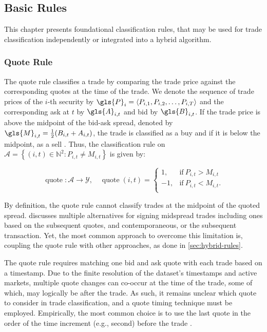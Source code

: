 \subsection{Basic Rules}\label{sec:basic-rules}

This chapter presents foundational classification rules, that may be used for trade classification independently or integrated into a hybrid algorithm.

\subsubsection{Quote Rule}\label{sec:quote-rule}

The quote rule classifies a trade by comparing the trade price against the corresponding quotes at the time of the trade. We denote the sequence of trade prices of the $i$-th security by $\gls{P}_i = \langle P_{i,1},P_{i,2},\dots,P_{i,T}\rangle$ and the corresponding ask at $t$ by $\gls{A}_{i,t}$ and bid by $\gls{B}_{i,t}$. If the trade price is above the midpoint of the bid-ask spread, denoted by $\gls{M}_{i,t} = \tfrac{1}{2}(B_{i,t} + A_{i,t})$, the trade is classified as a buy and if it is below the midpoint, as a sell \autocite[][41]{harrisDayEndTransactionPrice1989}. Thus, the classification rule on $\mathcal{A} = \left\{(i, t) \in \mathbb{N}^2: P_{i,t} \neq M_{i,t}\right\}$ is given by:

\begin{equation}
    \operatorname{quote}\colon \mathcal{A} \to \mathcal{Y},\quad
    \operatorname{quote}(i, t)=
    \begin{cases}
        1,  & \text{if}\ P_{i, t}>M_{i, t}  \\
        -1, & \text{if}\ P_{i, t}<M_{i, t}. \\
    \end{cases}
\end{equation}

By definition, the quote rule cannot classify trades at the midpoint of the quoted spread. \textcite[][241]{hasbrouckTradesQuotesInventories1988} discusses multiple alternatives for signing midspread trades including ones based on the subsequent quotes, and contemporaneous, or the subsequent transaction. Yet, the most common approach to overcome this limitation is, coupling the quote rule with other approaches, as done in \cref{sec:hybrid-rules}.

The quote rule requires matching one bid and ask quote with each trade based on a timestamp. Due to the finite resolution of the dataset's timestamps and active markets, multiple quote changes can co-occur at the time of the trade, some of which, may logically be after the trade. As such, it remains unclear which quote to consider in trade classification, and a quote timing technique must be employed. Empirically, the most common choice is to use the last quote in the order of the time increment (e.g., second) before the trade \autocite[][1765]{holdenLiquidityMeasurementProblems2014}.

